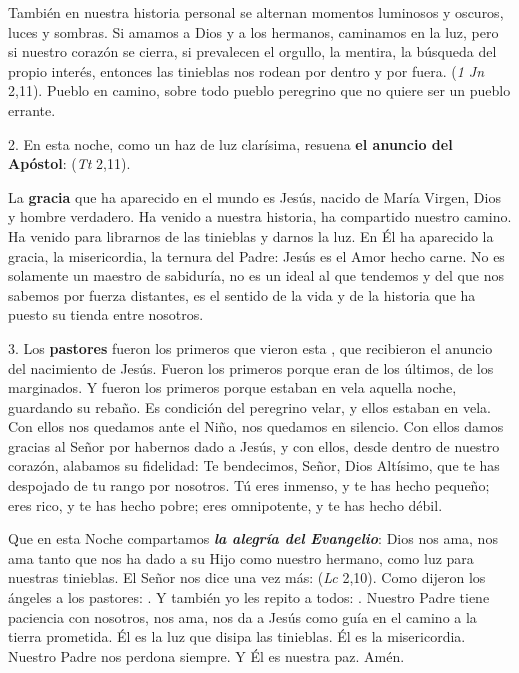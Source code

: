 \begin{body}
\begin{body}
También en nuestra historia personal se alternan momentos luminosos y oscuros, luces y sombras. Si amamos a Dios y a los hermanos, caminamos en la luz, pero si nuestro corazón se cierra, si prevalecen el orgullo, la mentira, la búsqueda del propio interés, entonces las tinieblas nos rodean por dentro y por fuera.  (\emph{1 Jn} 2,11). Pueblo en camino, sobre todo pueblo peregrino que no quiere ser un pueblo errante.

2. En esta noche, como un haz de luz clarísima, resuena \textbf{el anuncio del Apóstol}:  (\emph{Tt} 2,11).

La \textbf{gracia} que ha aparecido en el mundo es Jesús, nacido de María Virgen, Dios y hombre verdadero. Ha venido a nuestra historia, ha compartido nuestro camino. Ha venido para librarnos de las tinieblas y darnos la luz. En Él ha aparecido la gracia, la misericordia, la ternura del Padre: Jesús es el Amor hecho carne. No es solamente un maestro de sabiduría, no es un ideal al que tendemos y del que nos sabemos por fuerza distantes, es el sentido de la vida y de la historia que ha puesto su tienda entre nosotros.

3. Los \textbf{pastores} fueron los primeros que vieron esta , que recibieron el anuncio del nacimiento de Jesús. Fueron los primeros porque eran de los últimos, de los marginados. Y fueron los primeros porque estaban en vela aquella noche, guardando su rebaño. Es condición del peregrino velar, y ellos estaban en vela. Con ellos nos quedamos ante el Niño, nos quedamos en silencio. Con ellos damos gracias al Señor por habernos dado a Jesús, y con ellos, desde dentro de nuestro corazón, alabamos su fidelidad: Te bendecimos, Señor, Dios Altísimo, que te has despojado de tu rango por nosotros. Tú eres inmenso, y te has hecho pequeño; eres rico, y te has hecho pobre; eres omnipotente, y te has hecho débil.

Que en esta Noche compartamos \emph{\textbf{la alegría del Evangelio}}: Dios nos ama, nos ama tanto que nos ha dado a su Hijo como nuestro hermano, como luz para nuestras tinieblas. El Señor nos dice una vez más:  (\emph{Lc} 2,10). Como dijeron los ángeles a los pastores: . Y también yo les repito a todos: . Nuestro Padre tiene paciencia con nosotros, nos ama, nos da a Jesús como guía en el camino a la tierra prometida. Él es la luz que disipa las tinieblas. Él es la misericordia. Nuestro Padre nos perdona siempre. Y Él es nuestra paz. Amén.


\end{body}
\end{body}
